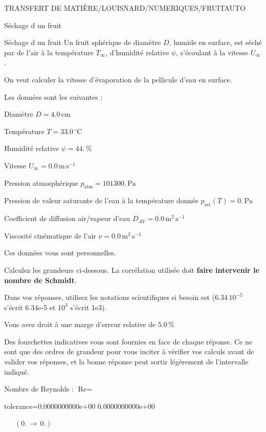 \documentclass[12pt]{article}
\begin{document}
\begin{quiz}{TRANSFERT DE MATIÈRE/LOUISNARD/NUMERIQUES/FRUITAUTO}
\begin{cloze}{Séchage d un fruit}
\end{cloze} 


 \begin{cloze}{Séchage d un fruit} 
Un fruit sphérique de diamètre $D$, humide en surface, est séché par de l'air à la température $T_\infty$, d'humidité relative $\psi$, s'écoulant à la vitesse $U_\infty$.

On veut calculer la vitesse d'évaporation de la pellicule d'eau en surface.

 

Les données sont les suivantes :

 

Diamètre $D = 4.0\,  \mathrm{cm} $

Température $T = 33.0\,  \mathrm{^\circ\mathrm{C}} $

Humidité relative $\psi = 44.\, \% $

Vitesse $U_\infty = 0.0\,  \mathrm{m}\,  \mathrm{s}^{-1} $

Pression atmosphérique $p_{\text{atm}} = 101300.\,  \mathrm{Pa} $

Pression de valeur saturante de l’eau à la température donnée $p_{\text{sat}}(T) = 0.\,  \mathrm{Pa} $

Coefficient de diffusion air/vapeur d’eau $D_{AV} = 0.0\,  \mathrm{m}^{2}\,  \mathrm{s}^{-1} $

Viscosité cinématique de l’air $\nu = 0.0\,  \mathrm{m}^{2}\,  \mathrm{s}^{-1} $

Ces données vous sont personnelles.

 

Calculez les grandeurs ci-dessous. La corrélation utilisée doit \textbf{faire intervenir le nombre de Schmidt}.

Dans vos réponses, utilisez les notations scientifiques si besoin est ($6.34\, 10^{-5}$ s'écrit 6.34e-5 et $10^{3}$ s'écrit 1e3).

Vous avez droit à une marge d'erreur relative de $5.0\, \% $

Des fourchettes indicatives vous sont fournies en face de chaque réponse. Ce ne sont que des ordres de grandeur pour vous inciter à vérifier vos calculs avant de valider vos réponses, et la bonne réponse peut sortir légèrement de l'intervalle indiqué.

 

Nombre de Reynolds : $\text{Re} =  $
\begin{numerical}[points=1] 
\item[tolerance={0.0000000000e+00}] 0.0000000000e+00 
\end{numerical} 
 $\,$ 
 $ \quad (0. \, \rightarrow \, 0.) $ 


\end{cloze}
\end{quiz}
\end{document}

